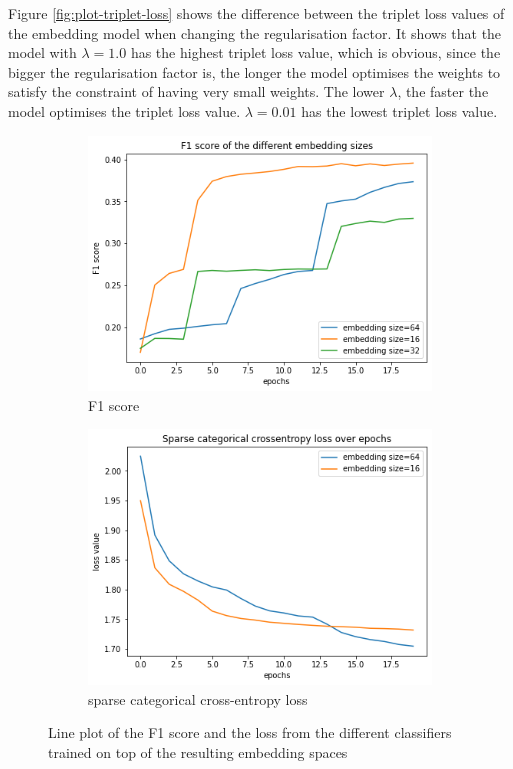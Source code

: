 \newline
\newline
Figure \ref{fig:plot-triplet-loss} shows the difference between the triplet loss values of the embedding model when changing the regularisation factor. It shows that the model with $\lambda = 1.0$ has the highest triplet loss value, which is obvious, since the bigger the regularisation factor is, the longer the model optimises the weights to satisfy the constraint of having very small weights. The lower $\lambda$, the faster the model optimises the triplet loss value. $\lambda = 0.01$ has the lowest triplet loss value.
\begin{figure}[tb]
\centering
\begin{subfigure}{.5\linewidth}
  \centering
  \includegraphics[width=.9\linewidth]{study-doc/experiment_embedding_size/assets/classifier_f1.png}
  \caption{F1 score}
  \label{fig:regularisation-experiment-classifier-f1}
\end{subfigure}%
\begin{subfigure}{.5\linewidth}
  \centering
  \includegraphics[width=.9\linewidth]{study-doc/experiment_embedding_size/assets/classifier_loss.png}
  \caption{sparse categorical cross-entropy loss}
  \label{fig:regularisation-experiment-classifier-loss}
\end{subfigure}
\caption{Line plot of the F1 score and the loss from the different classifiers trained on top of the resulting embedding spaces}
\label{fig:regularisation-experiment-classifier-metrics}
\end{figure}
